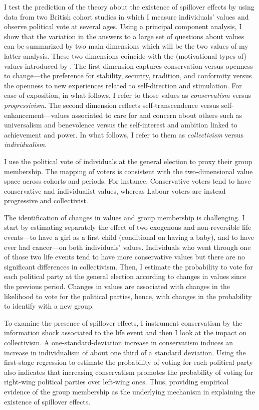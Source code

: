 I test the prediction of the theory about the existence of spillover effects by using data from two British cohort studies in which I measure individuals' values and observe political vote at several ages. Using a principal component analysis, I show that the variation in the answers to a large set of questions about values can be summarized by two main dimensions which will be the two values of my latter analysis. These two dimensions coincide with the (motivational types of) values introduced by \citet{Schwartz1992Universals, Schwartz2012Overview}.
The first dimension captures conservation versus openness to change---the preference for stability, security, tradition, and conformity versus the openness to new experiences related to self-direction and stimulation. For ease of exposition, in what follows, I refer to those values as \textit{conservatism} versus \textit{progressivism}.
The second dimension reflects self-transcendence versus self-enhancement---values associated to care for and concern about others such as universalism and benevolence versus the self-interest and ambition linked to achievement and power. In what follows, I refer to them as \textit{collectivism} versus \textit{individualism}.

I use the political vote of individuals at the general election to proxy their group membership. The mapping of voters is consistent with the two-dimensional value space across cohorts and periods. For instance, Conservative voters tend to have conservative and individualist values, whereas Labour voters are instead progressive and collectivist.

The identification of changes in values and group membership is challenging. 
I start by estimating separately the effect of two exogenous and non-reversible life events---to have a girl as a first child (conditional on having a baby), and to have ever had cancer---on both individuals' values. Individuals who went through one of those two life events tend to have more conservative values but there are no significant differences in collectivism. 
Then, I estimate the probability to vote for each political party at the general election according to changes in values since the previous period. Changes in values are associated with changes in the likelihood to vote for the political parties, hence, with changes in the probability to identify with a new group.

To examine the presence of spillover effects, I instrument conservatism by the information shock associated to the life event and then I look at the impact on collectivism. A one-standard-deviation increase in conservatism induces an increase in individualism of about one third of a standard deviation. Using the first-stage regression to estimate the probability of voting for each political party also indicates that increasing conservatism promotes the probability of voting for right-wing political parties over left-wing ones. Thus, providing empirical evidence of the group membership as the underlying mechanism in explaining the existence of spillover effects.

